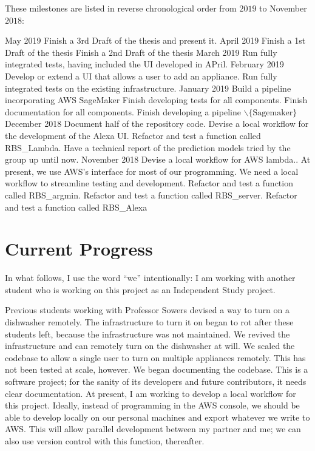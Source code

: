 \documentclass[a4paper]{article}
\begin{document}
These milestones are listed in reverse chronological order from $2019$ to November $2018$:

\begin{outline}
    \1 May 2019
    \2 Finish a 3rd Draft of the thesis and present it.
    \1 April 2019
    \2 Finish a 1st Draft of the thesis 
    \2 Finish a 2nd Draft of the thesis 
    \1 March 2019
    \2 Run fully integrated tests, having included the UI developed in APril.
    \1 February 2019
    \2 Develop or extend a UI that allows a user to add an appliance.
    \2 Run fully integrated tests on the existing infrastructure.
    \1 January 2019
    \2 Build a pipeline incorporating AWS SageMaker
    \2 Finish developing tests for all components.
    \2 Finish documentation for all components.
    \2 Finish developing a pipeline $\smallsetminus \{\text{Sagemaker}\}$
    \1 December 2018
    \2 Document half of the repository code.
    \2 Devise a local workflow for the development of the Alexa UI.
    \2 Refactor and test a function called RBS\_Lambda.
    \2 Have a technical report of the prediction models tried by the group up until now.
    \1 November 2018
    \2 Devise a local workflow for AWS lambda.. At present, we use AWS's interface for most of our programming. We need a local workflow to
    streamline testing and development.
    \2 Refactor and test a function called RBS\_argmin.
    \2 Refactor and test a function called RBS\_server.
    \2 Refactor and test a function called RBS\_Alexa
\end{outline}


\section{Current Progress}

In what follows, I use the word ``we'' intentionally: I am working with another student who is working on this project as an Independent Study project.

\begin{outline}
    \1 Previous students working with Professor Sowers devised a way to turn on a dishwasher remotely. The infrastructure to turn it on began to
    rot after these students left, because the infrastructure was not maintained. We revived the infrastructure and can remotely turn on the dishwasher at will.
    \1 We scaled the codebase to allow a single user to turn on multiple appliances remotely. This has not been tested at scale, however.
    \1 We began documenting the codebase. This is a software project; for the sanity of its developers and future contributors, it needs clear documentation.
    \1 At present, I am working to develop a local workflow for this project. Ideally, instead of programming in the AWS console, we should be able to develop locally on our personal
    machines and export whatever we write to AWS. This will allow parallel development between my partner and me; we can also use version control with this function, thereafter.
\end{outline}


    
\end{document}
